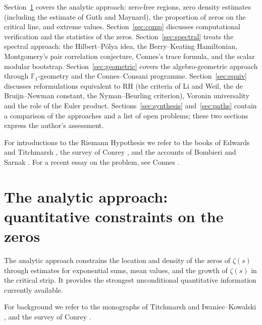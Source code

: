 \documentclass[11pt]{amsart}
\theoremstyle{definition}
\theoremstyle{remark}
\begin{document}
Section~\ref{sec:analytic} covers the analytic approach: zero-free regions, zero density estimates (including the estimate of Guth and Maynard), the proportion of zeros on the critical line, and extreme values. Section~\ref{sec:comp} discusses computational verification and the statistics of the zeros. Section~\ref{sec:spectral} treats the spectral approach: the Hilbert--P\'olya idea, the Berry--Keating Hamiltonian, Montgomery's pair correlation conjecture, Connes's trace formula, and the scalar modular bootstrap. Section~\ref{sec:geometric} covers the algebro-geometric approach through $\mathbb{F}_1$-geometry and the Connes--Consani programme. Section~\ref{sec:equiv} discusses reformulations equivalent to RH (the criteria of Li and Weil, the de Bruijn--Newman constant, the Nyman--Beurling criterion), Voronin universality and the role of the Euler product. Sections~\ref{sec:synthesis} and~\ref{sec:paths} contain a comparison of the approaches and a list of open problems; these two sections express the author's assessment.

For introductions to the Riemann Hypothesis we refer to the books of Edwards \cite{edwards1974} and Titchmarsh \cite{titchmarsh1986}, the survey of Conrey \cite{conrey2003}, and the accounts of Bombieri \cite{bombieri2000} and Sarnak \cite{sarnak2004}. For a recent essay on the problem, see Connes \cite{connes2026}.

\section{The analytic approach: quantitative constraints on the zeros}\label{sec:analytic}

The analytic approach constrains the location and density of the zeros of $\zeta(s)$ through estimates for exponential sums, mean values, and the growth of $\zeta(s)$ in the critical strip. It provides the strongest unconditional quantitative information currently available.

For background we refer to the monographs of Titchmarsh \cite{titchmarsh1986} and Iwaniec--Kowalski \cite{iwaniec2004}, and the survey of Conrey \cite{conrey2003}.
\end{document}

